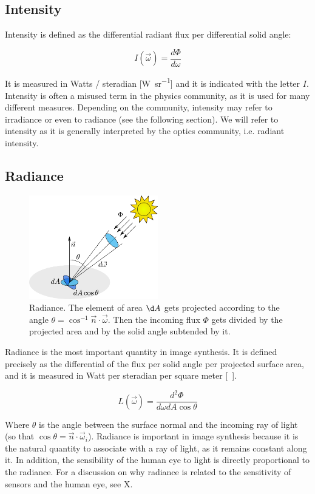 \subsection{Intensity}
Intensity is defined as the differential radiant flux per differential solid angle:

$$
I(\vec{\omega}) = \frac{d \Phi}{d \omega}
$$

It is measured in Watts / steradian [\si{\watt\per\steradian}] and it is indicated with the letter $I$. Intensity is often a misused term in the physics community, as it is used for many different measures. Depending on the community, intensity may refer to irradiance or even to radiance (see the following section). We will refer to intensity as it is generally interpreted by the optics community, i.e. radiant intensity. 


\subsection{Radiance}


\begin{figure}[!ht]
\centering
\includegraphics[width=0.5\textwidth]{images/radiance.pdf}
\caption{Radiance. The element of area $\d A$ gets projected according to the angle $\theta = \cos^{-1}{\vec{n} \cdot \vec{\omega}}$. Then the incoming flux $\Phi$ gets divided by the projected area and by the solid angle subtended by it.}
\label{fig:spectrum}
\end{figure}


Radiance is the most important quantity in image synthesis. It is defined precisely as the differential of the flux per solid angle per projected surface area, and it is measured in Watt per steradian per square meter [\si{\watt\per\steradian\meter\square}].

$$
L(\vec{\omega}) = \frac{d^2 \Phi}{d\omega dA \cos \theta}
$$

Where $\theta$ is the angle between the surface normal and the incoming ray of light (so that $\cos\theta = \vec{n} \cdot \vec{\omega}_i$). Radiance is important in image synthesis because it is the natural quantity to associate with a ray of light, as it remains constant along it. In addition, the sensibility of the human eye to light is directly proportional to the radiance. For a discussion on why radiance is related to the sensitivity of sensors and the human eye, see X.

